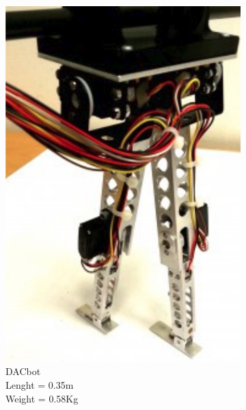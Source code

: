 \begin{figure}[h]
\centering
  \begin{subfigure}{.22\textwidth}
    \includegraphics[width=0.9\linewidth]{figures/w_dacbot.pdf}
    \caption{DACbot\\
    Lenght = 0.35m\\
    Weight = 0.58Kg}
    \label{fig:w_dacbot}
  \end{subfigure}
  \begin{subfigure}{.22\textwidth}

\end{subfigure}
\end{figure}
